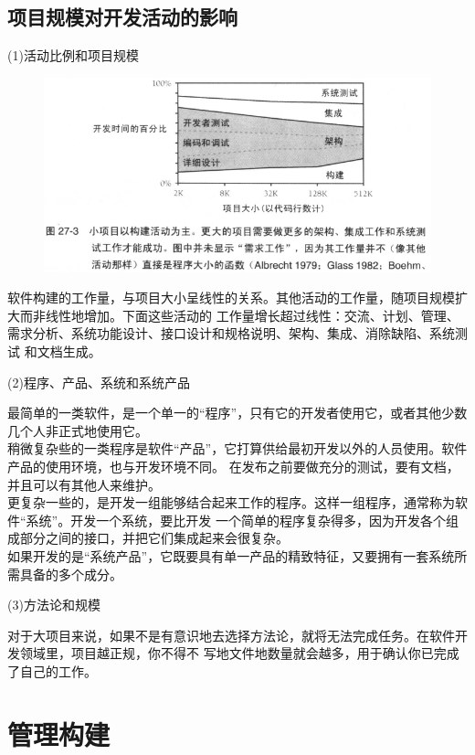 \documentclass{article}
\begin{document}
\subsection{项目规模对开发活动的影响}
\par
(1)活动比例和项目规模
\par
\begin{figure}[htb]
    \centering
    \includegraphics[width=15cm]{figure23.png}
\end{figure}
软件构建的工作量，与项目大小呈线性的关系。其他活动的工作量，随项目规模扩大而非线性地增加。下面这些活动的
工作量增长超过线性：交流、计划、管理、需求分析、系统功能设计、接口设计和规格说明、架构、集成、消除缺陷、系统测试
和文档生成。

\par
(2)程序、产品、系统和系统产品
\par
最简单的一类软件，是一个单一的“程序”，只有它的开发者使用它，或者其他少数几个人非正式地使用它。\\
稍微复杂些的一类程序是软件“产品”，它打算供给最初开发以外的人员使用。软件产品的使用环境，也与开发环境不同。
在发布之前要做充分的测试，要有文档，并且可以有其他人来维护。\\
更复杂一些的，是开发一组能够结合起来工作的程序。这样一组程序，通常称为软件“系统”。开发一个系统，要比开发
一个简单的程序复杂得多，因为开发各个组成部分之间的接口，并把它们集成起来会很复杂。\\
如果开发的是“系统产品”，它既要具有单一产品的精致特征，又要拥有一套系统所需具备的多个成分。

\par
(3)方法论和规模
\par
对于大项目来说，如果不是有意识地去选择方法论，就将无法完成任务。在软件开发领域里，项目越正规，你不得不
写地文件地数量就会越多，用于确认你已完成了自己的工作。

\section{管理构建}
\end{document}
